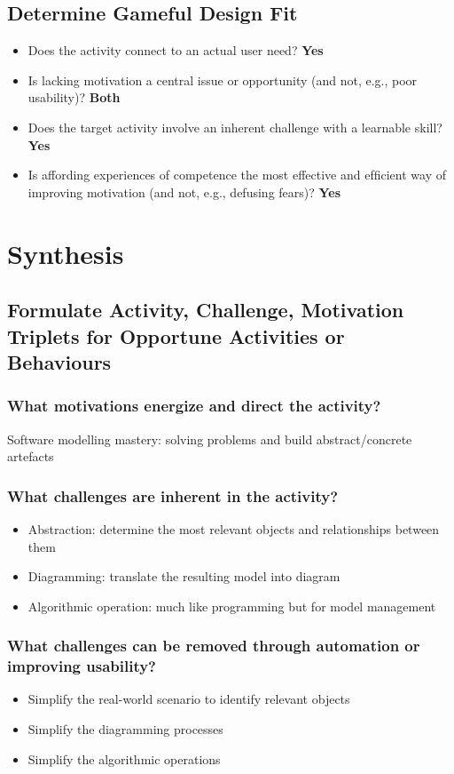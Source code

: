 \documentclass[12pt, a4paper]{report}
\begin{document}
\begin{appendices}
\subsection{Determine Gameful Design Fit}
\begin{itemize}
\item Does the activity connect to an actual user need? \textbf{Yes}
\item Is lacking motivation a central issue or opportunity (and not, e.g., poor usability)? \textbf{Both}
\item Does the target activity involve an inherent challenge with a learnable skill? \textbf{Yes}
\item Is affording experiences of competence the most effective and efﬁcient way of improving motivation (and not, e.g., defusing fears)? \textbf{Yes}
\end{itemize}

\section{Synthesis}
\subsection{Formulate Activity, Challenge, Motivation  Triplets for Opportune Activities or Behaviours}

\subsubsection{What motivations energize and direct the activity?}
Software modelling mastery: solving problems and build abstract/concrete artefacts
\subsubsection{What challenges are inherent in the activity?}
\begin{itemize}
\item Abstraction: determine the most relevant objects and relationships between them
\item Diagramming: translate the resulting model into diagram
\item Algorithmic operation: much like programming but for model management
\end{itemize}
\subsubsection{What challenges can be removed through automation or improving usability?} 
\begin{itemize}
\item Simplify the real-world scenario to identify relevant objects
\item Simplify the diagramming processes
\item Simplify the algorithmic operations
\end{itemize}

\end{appendices}
\end{document}
